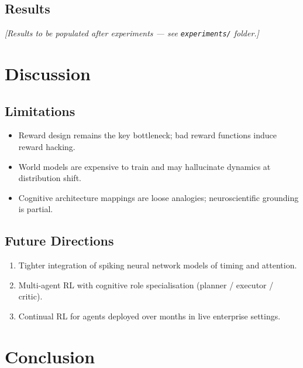 \documentclass[12pt,a4paper]{article}
\begin{document}
\subsection{Results}

\textit{[Results to be populated after experiments — see \texttt{experiments/} folder.]}

\section{Discussion}

\subsection{Limitations}

\begin{itemize}[noitemsep]
  \item Reward design remains the key bottleneck; bad reward functions induce reward hacking.
  \item World models are expensive to train and may hallucinate dynamics at distribution shift.
  \item Cognitive architecture mappings are loose analogies; neuroscientific grounding is partial.
\end{itemize}

\subsection{Future Directions}

\begin{enumerate}[noitemsep]
  \item Tighter integration of spiking neural network models of timing and attention.
  \item Multi-agent RL with cognitive role specialisation (planner / executor / critic).
  \item Continual RL for agents deployed over months in live enterprise settings.
\end{enumerate}

\section{Conclusion}
\end{document}
